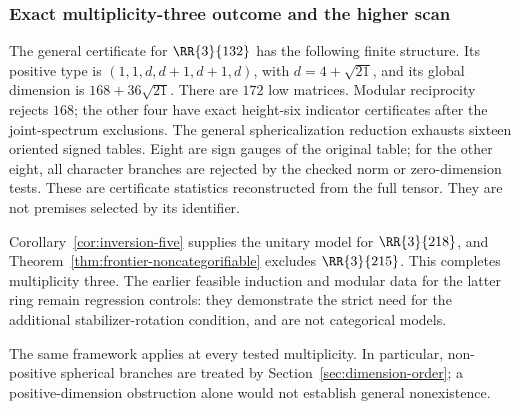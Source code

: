 \subsubsection{Exact multiplicity-three outcome and the higher scan}
The general certificate for $\RR{3}{132}$ has the following finite
structure. Its positive type is $(1,1,d,d+1,d+1,d)$, with
$d=4+\sqrt{21}$, and its global dimension is $168+36\sqrt{21}$.
There are $172$ low matrices. Modular reciprocity rejects $168$;
the other four have exact height-six indicator certificates after the
joint-spectrum exclusions. The general sphericalization reduction
exhausts sixteen oriented signed tables. Eight are sign gauges of the
original table; for the other eight, all character branches are rejected
by the checked norm or zero-dimension tests. These are certificate
statistics reconstructed from the full tensor. They are not premises
selected by its identifier.

Corollary~\ref{cor:inversion-five} supplies the unitary model for
$\RR{3}{218}$, and Theorem~\ref{thm:frontier-noncategorifiable}
excludes $\RR{3}{215}$. This completes multiplicity three.
The earlier feasible induction and modular data for the latter ring
remain regression controls: they demonstrate the strict need for the
additional stabilizer-rotation condition, and are not categorical models.

The same framework applies at every tested multiplicity. In particular,
non-positive spherical branches are treated by
Section~\ref{sec:dimension-order}; a positive-dimension obstruction alone
would not establish general nonexistence.













